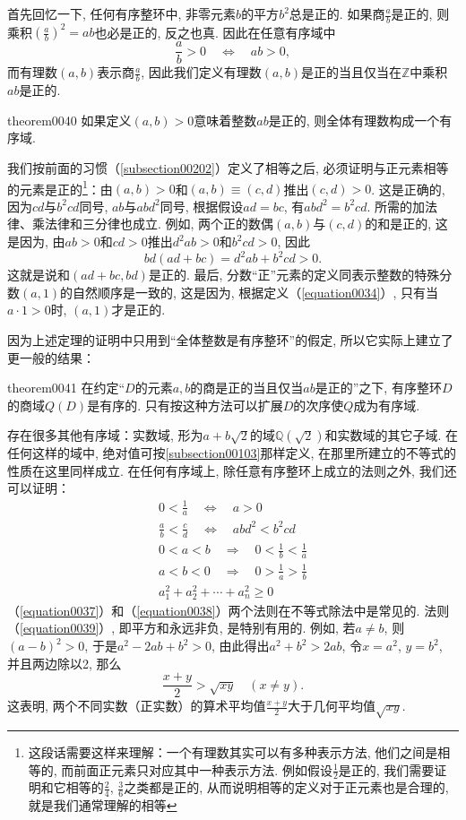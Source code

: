 首先回忆一下, 任何有序整环中, 非零元素$b$的平方$b^2$总是正的. 如果商$\frac{a}{b}$是正的, 则乘积$(\frac{a}{b})^2=ab$也必是正的, 反之也真. 因此在任意有序域中
\begin{equation}\label{equation0034}
\frac{a}{b} > 0 \quad \Leftrightarrow \quad ab>0,
\end{equation}
而有理数$(a, b)$表示商$\frac{a}{b}$, 因此我们定义有理数$(a,b)$是正的当且仅当在$\mathbb{Z}$中乘积$ab$是正的. 
\begin{theorem}{}{theorem0040}
如果定义$(a, b)>0$意味着整数$ab$是正的, 则全体有理数构成一个有序域. 
\end{theorem}
我们按前面的习惯（\ref{subsection00202}）定义了相等之后, 必须证明与正元素相等的元素是正的\footnote{这段话需要这样来理解：一个有理数其实可以有多种表示方法, 他们之间是相等的, 而前面正元素只对应其中一种表示方法. 例如假设$\frac{1}{2}$是正的, 我们需要证明和它相等的$\frac{2}{4}$, $\frac{3}{6}$之类都是正的, 从而说明相等的定义对于正元素也是合理的, 就是我们通常理解的相等}：由$(a, b)>0$和$(a, b) \equiv (c, d)$推出$(c, d)>0$. 这是正确的, 因为$cd$与$b^2cd$同号, $ab$与$abd^2$同号, 根据假设$ad=bc$, 有$abd^2=b^2cd$. 所需的加法律、乘法律和三分律也成立. 例如, 两个正的数偶$(a, b)$与$(c, d)$的和是正的, 这是因为, 由$ab>0$和$cd>0$推出$d^2ab>0$和$b^2cd>0$, 因此
\[
bd(ad+bc) = d^2ab + b^2cd > 0.
\]
这就是说和$(ad+bc, bd)$是正的. 最后, 分数“正”元素的定义同表示整数的特殊分数$(a, 1)$的自然顺序是一致的, 这是因为, 根据定义（\ref{equation0034}）, 只有当$a \cdot 1 > 0$时, $(a, 1)$才是正的. 

因为上述定理的证明中只用到“全体整数是有序整环”的假定, 所以它实际上建立了更一般的结果：
\begin{theorem}{}{theorem0041}
在约定“$D$的元素$a, b$的商是正的当且仅当$ab$是正的”之下, 有序整环$D$的商域$Q(D)$是有序的. 只有按这种方法可以扩展$D$的次序使$Q$成为有序域. 
\end{theorem}

存在很多其他有序域：实数域, 形为$a+b\sqrt{2}$的域$\mathbb{Q}(\sqrt{2})$和实数域的其它子域. 在任何这样的域中, 绝对值可按\ref{subsection00103}那样定义, 在那里所建立的不等式的性质在这里同样成立. 在任何有序域上, 除任意有序整环上成立的法则之外, 我们还可以证明：
\begin{gather}
0 < \frac{1}{a} \quad \Leftrightarrow \quad a > 0 \label{equation0035}\\
\frac{a}{b} < \frac{c}{d} \quad \Leftrightarrow \quad abd^2 < b^2cd \label{equation0036}\\
0 < a < b \quad \Rightarrow \quad 0 < \frac{1}{b} < \frac{1}{a} \label{equation0037}\\
a < b < 0 \quad\Rightarrow\quad 0 > \frac{1}{a} > \frac{1}{b} \label{equation0038}\\
a_1^2+a_2^2+\cdots+a_n^2 \ge 0 \label{equation0039}
\end{gather}
（\ref{equation0037}）和（\ref{equation0038}）两个法则在不等式除法中是常见的. 法则（\ref{equation0039}）, 即平方和永远非负, 是特别有用的. 例如, 若$a \neq b$, 则$(a-b)^2>0$, 于是$a^2-2ab+b^2>0$, 由此得出$a^2+b^2 > 2ab$, 令$x=a^2$, $y=b^2$, 并且两边除以2, 那么
\[
\frac{x+y}{2} > \sqrt{xy}\quad(x \neq y).
\]
这表明, 两个不同实数（正实数）的算术平均值$\frac{x+y}{2}$大于几何平均值$\sqrt{xy}$. 

